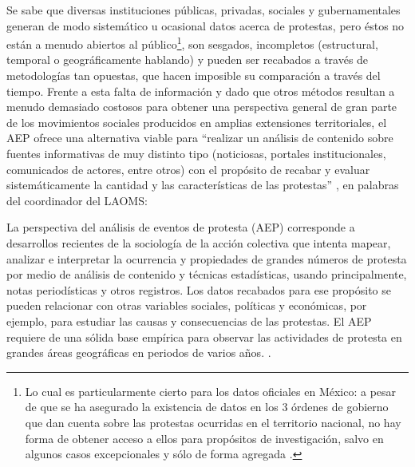\documentclass[letterpaper, 11pt]{book}
\theoremstyle{definition}
\theoremstyle{remark}
\begin{document}
Se sabe que diversas instituciones públicas, privadas, sociales y gubernamentales generan de modo sistemático u ocasional datos acerca de protestas, pero éstos no están a menudo abiertos al público\footnote{Lo cual es particularmente cierto para los datos oficiales en México: a pesar de que se ha asegurado la existencia de datos en los 3 órdenes de gobierno que dan cuenta sobre las protestas ocurridas en el territorio nacional, no hay forma de obtener acceso a ellos para propósitos de investigación, salvo en algunos casos excepcionales y sólo de forma agregada \citep[81]{2005_Strawn_Tesis}.}, son sesgados, incompletos (estructural, temporal o geográficamente hablando) y pueden ser recabados a través de metodologías tan opuestas, que hacen imposible su comparación a través del tiempo. 
Frente a esta falta de información y dado que otros métodos resultan a menudo demasiado costosos para obtener una perspectiva general de gran parte de los movimientos sociales producidos en amplias extensiones territoriales, el AEP ofrece una alternativa viable para ``realizar un análisis de contenido sobre fuentes informativas de muy distinto tipo (noticiosas, portales institucionales, comunicados de actores, entre otros) con el propósito de recabar y evaluar sistemáticamente la cantidad y las características de las protestas'' \citep[1]{2017_Urbina_estudiantes}, en palabras del coordinador del LAOMS:


\begin{center}
    \begin{minipage}{0.9\linewidth}
        {\setlength{\parindent}{12pt}\small
        La perspectiva del análisis de eventos de protesta (AEP) corresponde a desarrollos recientes de la sociología de la acción colectiva que intenta mapear, analizar e interpretar la ocurrencia y propiedades de grandes números de protesta por medio de análisis de contenido y técnicas estadísticas, usando principalmente, notas periodísticas y otros registros. 
        Los datos recabados para ese propósito se pueden relacionar con otras variables sociales, políticas y económicas, por ejemplo, para estudiar las causas y consecuencias de las protestas. 
        El AEP requiere de una sólida base empírica para observar las actividades de protesta en grandes áreas geográficas en periodos de varios años. \normalsize \citep[30--31]{2010_Cadena_LAOMS}.
        }
    \end{minipage}
\end{center}
\end{document}

